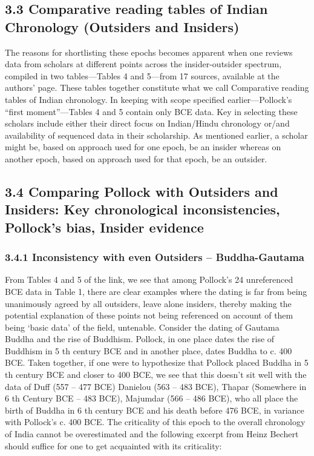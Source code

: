 \subsection*{3.3 Comparative reading tables of Indian Chronology (Outsiders and Insiders)}

The reasons for shortlisting these epochs becomes apparent when one reviews data from scholars at different points across the insider-outsider spectrum, compiled in two tables—Tables 4 and 5—from 17 sources, available at the authors’ page. These tables together constitute what we call Comparative reading tables of Indian chronology. In keeping with scope specified earlier—Pollock’s “first moment”—Tables 4 and 5 contain only BCE data. Key in selecting these scholars include either their direct focus on Indian/Hindu chronology or/and availability of sequenced data in their scholarship. As mentioned earlier, a scholar might be, based on approach used for one epoch, be an insider whereas on another epoch, based on approach used for that epoch, be an outsider.


\subsection*{3.4 Comparing Pollock with Outsiders and Insiders: Key chronological inconsistencies, Pollock’s bias, Insider evidence}

\subsubsection*{3.4.1 Inconsistency with even Outsiders – Buddha-Gautama}

From Tables 4 and 5 of the link, we see that among Pollock’s 24 unreferenced BCE data in Table 1, there are clear examples where the dating is far from being unanimously agreed by all outsiders, leave alone insiders, thereby making the potential explanation of these points not being referenced on account of them being ‘basic data’ of the field, untenable. Consider the dating of Gautama Buddha and the rise of Buddhism. Pollock, in one place dates the rise of Buddhism in 5 th century BCE and in another place, dates Buddha to c. 400 BCE. Taken together, if one were to hypothesize that Pollock placed Buddha in 5 th century BCE and closer to 400 BCE, we see that this doesn’t sit well with the data of Duff (557 – 477 BCE) Danielou (563 – 483 BCE), Thapar (Somewhere in 6 th Century BCE – 483 BCE), Majumdar (566 – 486 BCE), who all place the birth of Buddha in 6 th century BCE and his death before 476 BCE, in variance with Pollock’s c. 400 BCE. The criticality of this epoch to the overall chronology of India cannot be overestimated and the following excerpt from Heinz Bechert should suffice for one to get acquainted with its criticality:

